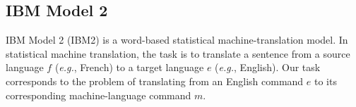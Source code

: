 \documentclass[conference]{IEEEtran}
\begin{document}

\subsection{IBM Model 2}

IBM Model 2 (IBM2) \cite{brown90,brown93} is a word-based statistical machine-translation model. In statistical machine translation, the task is to translate a sentence from a source language $f$ (\emph{e.g.}, French) to a target language $e$ (\emph{e.g.}, English). Our task corresponds to the problem of translating from an English command $e$ to its corresponding machine-language command $m$. 
\end{document}
